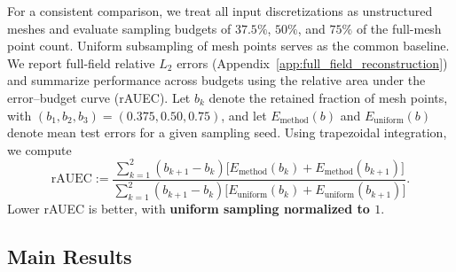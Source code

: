 For a consistent comparison, we treat all input discretizations as unstructured meshes and evaluate sampling budgets of $37.5\%$, $50\%$, and $75\%$ of the full-mesh point count. Uniform subsampling of mesh points serves as the common baseline. We report full-field relative $L_2$ errors (Appendix~\ref{app:full_field_reconstruction}) and summarize performance across budgets using the relative area under the error--budget curve (rAUEC). Let $b_k$ denote the retained fraction of mesh points, with $(b_1,b_2,b_3)=(0.375,0.50,0.75)$, and let $E_{\mathrm{method}}(b)$ and $E_{\mathrm{uniform}}(b)$ denote mean test errors for a given sampling seed. Using trapezoidal integration, we compute
\begin{equation}
    \mathrm{rAUEC}
    :=
    \frac{\sum_{k=1}^{2}(b_{k+1}-b_k)
          \bigl[E_{\mathrm{method}}(b_k)+E_{\mathrm{method}}(b_{k+1})\bigr]}
         {\sum_{k=1}^{2}(b_{k+1}-b_k)
          \bigl[E_{\mathrm{uniform}}(b_k)+E_{\mathrm{uniform}}(b_{k+1})\bigr]}.
    \label{eq:rauec}
\end{equation}
Lower rAUEC is better, with \textbf{uniform sampling normalized to $1$}.


\subsection{Main Results}
\label{sec:main_results}

